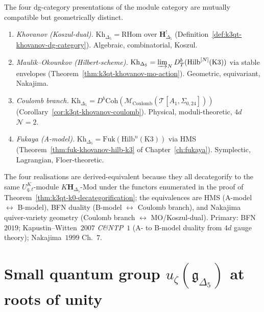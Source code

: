 \begin{remark}
\label{rem:k3qt-four-categorifications}
The four dg-category presentations of the module category are
mutually compatible but geometrically distinct.
\begin{enumerate}[label=\textup{(\roman*)}]
\item \emph{Khovanov (Koszul-dual).}
$\mathrm{Kh}_{\Delta_5} = \mathrm{RHom}$ over $\mathbf H_{\Delta_5}^!$
(Definition~\ref{def:k3qt-khovanov-dg-category}). Algebraic,
combinatorial, Koszul.
\item \emph{Maulik--Okounkov (Hilbert-scheme).}
$\mathrm{Kh}_{\Delta_5} = \varinjlim_N D^b_T(\mathrm{Hilb}^{[N]}(\mathrm K3))$
via stable envelopes
(Theorem~\ref{thm:k3qt-khovanov-mo-action}). Geometric, equivariant,
Nakajima.
\item \emph{Coulomb branch.}
$\mathrm{Kh}_{\Delta_5} =
D^b\mathrm{Coh}(\mathcal M_{\mathrm{Coulomb}}(\mathcal T[A_1,
\Sigma_{0, 24}]))$ (Corollary~\ref{cor:k3qt-khovanov-coulomb}).
Physical, moduli-theoretic, $4d$ $\mathcal N = 2$.
\item \emph{Fukaya (A-model).}
$\mathrm{Kh}_{\Delta_5} = \mathrm{Fuk}(\mathrm{Hilb}^n(\mathrm K3))$
via HMS (Theorem~\ref{thm:fuk-khovanov-hilb-k3} of
Chapter~\ref{ch:fukaya}). Symplectic, Lagrangian,
Floer-theoretic.
\end{enumerate}
The four realisations are derived-equivalent because they all decategorify
to the same $U^K_{q,t}$-module $K\mathbf H_{\Delta_5}\text{-}\mathrm{Mod}$
under the functors enumerated in the proof of
Theorem~\ref{thm:k3qt-k0-decategorification}; the equivalences are
HMS (A-model $\leftrightarrow$ B-model), BFN duality
(B-model $\leftrightarrow$ Coulomb branch), and Nakajima quiver-variety
geometry (Coulomb branch $\leftrightarrow$ MO/Koszul-dual).
Primary: BFN~$2019$; Kapustin--Witten~$2007$ \emph{C\&NTP}~$1$ (A- to
B-model duality from $4d$ gauge theory); Nakajima~$1999$ Ch.~$7$.
\end{remark}

\section{Small quantum group \texorpdfstring{$u_\zeta(\mathfrak g_{\Delta_5})$}{u-zeta(g-Delta-5)} at roots of unity}
\label{sec:k3qt-small-qgroup-delta5}

